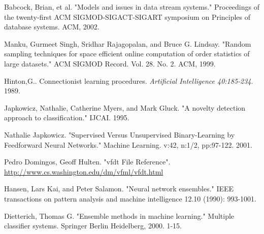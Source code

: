 \documentclass[conference]{IEEEtran}
\begin{document}
\begin{thebibliography}{9}
			Babcock, Brian, et al. "Models and issues in data stream systems." Proceedings of the twenty-first ACM SIGMOD-SIGACT-SIGART symposium on Principles of database systems. ACM, 2002.
			
			Manku, Gurmeet Singh, Sridhar Rajagopalan, and Bruce G. Lindsay. "Random sampling techniques for space efficient online computation of order statistics of large datasets." ACM SIGMOD Record. Vol. 28. No. 2. ACM, 1999.
			
			
			Hinton,G.. Connectionist learning procedures. \textit{Artificial Intelligence  40:185-234}. 1989. 
			
			Japkowicz, Nathalie, Catherine Myers, and Mark Gluck. "A novelty detection approach to classification." IJCAI. 1995.
			
			Nathalie Japkowicz. "Supervised Versus Unsupervised Binary-Learning by Feedforward Neural Networks." Machine Learning. v:42, n:1/2, pp:97-122. 2001.
			
			Pedro Domingos, Geoff Hulten. "vfdt File Reference". \url{http://www.cs.washington.edu/dm/vfml/vfdt.html}
			
			Hansen, Lars Kai, and Peter Salamon. "Neural network ensembles." IEEE transactions on pattern analysis and machine intelligence 12.10 (1990): 993-1001.
			
			Dietterich, Thomas G. "Ensemble methods in machine learning." Multiple classifier systems. Springer Berlin Heidelberg, 2000. 1-15.
			
			
			
			
			
			

\end{thebibliography}
\end{document}
